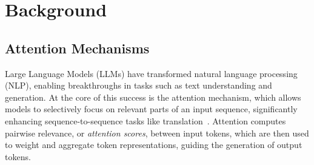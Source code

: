 


\section{Background}
\label{sec:moti}









\subsection{Attention Mechanisms}

Large Language Models (LLMs) have transformed natural language processing (NLP), enabling breakthroughs in tasks such as text understanding and generation. At the core of this success is the attention mechanism, which allows models to selectively focus on relevant parts of an input sequence, significantly enhancing sequence-to-sequence tasks like translation~\cite{bahdanau2014neural}. Attention computes pairwise relevance, or \textit{attention scores}, between input tokens, which are then used to weight and aggregate token representations, guiding the generation of output tokens.


